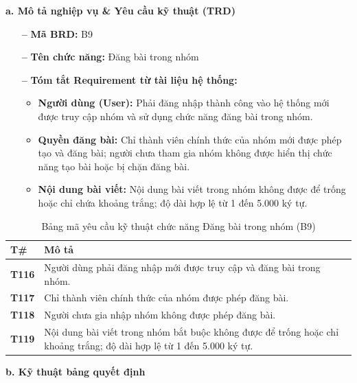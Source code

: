\documentclass[11pt,a4paper]{article}
\begin{document}
\noindent\textbf{a. Mô tả nghiệp vụ \& Yêu cầu kỹ thuật (TRD)}
\begin{itemize}[leftmargin=1.2cm, noitemsep]
    \item[\textbf{--}] \textbf{Mã BRD:} B9
    \item[\textbf{--}] \textbf{Tên chức năng:} Đăng bài trong nhóm
    \item[\textbf{--}] \textbf{Tóm tắt Requirement từ tài liệu hệ thống:}
    \begin{itemize}[leftmargin=0.8cm, label=$\ast$, noitemsep]
        \item \textbf{Người dùng (User):} Phải đăng nhập thành công vào hệ thống mới được truy cập nhóm và sử dụng chức năng đăng bài trong nhóm.
        \item \textbf{Quyền đăng bài:} Chỉ thành viên chính thức của nhóm mới được phép tạo và đăng bài; người chưa tham gia nhóm không được hiển thị chức năng tạo bài hoặc bị chặn đăng bài.
        \item \textbf{Nội dung bài viết:} Nội dung bài viết trong nhóm không được để trống hoặc chỉ chứa khoảng trắng; độ dài hợp lệ từ 1 đến 5.000 ký tự.
    \end{itemize}
\end{itemize}

\begin{table}[H]
\centering
\small
\begin{tabularx}{\textwidth}{|C{1.5cm}|X|}
\hline
{}
\textbf{T\#} & \textbf{Mô tả} \tabularnewline
\hline
\textbf{T116} & Người dùng phải đăng nhập mới được truy cập và đăng bài trong nhóm. \\ \hline
\textbf{T117} & Chỉ thành viên chính thức của nhóm được phép đăng bài. \\ \hline
\textbf{T118} & Người chưa gia nhập nhóm không được phép đăng bài. \\ \hline
\textbf{T119} & Nội dung bài viết trong nhóm bắt buộc không được để trống hoặc chỉ khoảng trắng; độ dài hợp lệ từ 1 đến 5.000 ký tự. \\ \hline
\end{tabularx}
\caption{Bảng mã yêu cầu kỹ thuật chức năng Đăng bài trong nhóm (B9)}
\end{table}

\noindent\textbf{b. Kỹ thuật bảng quyết định}
\end{document}
